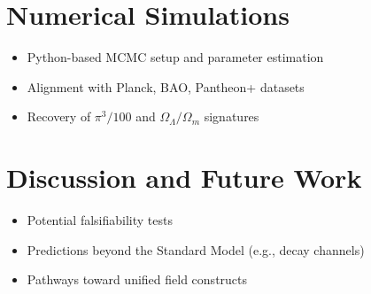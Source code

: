 \documentclass[12pt]{article}
\begin{document}
\section{Numerical Simulations}
\begin{itemize}[leftmargin=*, label={--}]
  \item Python-based MCMC setup and parameter estimation
  \item Alignment with Planck, BAO, Pantheon+ datasets
  \item Recovery of $\pi^3/100$ and $\Omega_\Lambda/\Omega_m$ signatures
\end{itemize}

\section{Discussion and Future Work}
\begin{itemize}[leftmargin=*, label={--}]
  \item Potential falsifiability tests
  \item Predictions beyond the Standard Model (e.g., decay channels)
  \item Pathways toward unified field constructs
\end{itemize}


\end{document}
